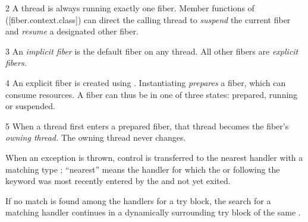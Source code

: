 
2 A thread is always running exactly one fiber. Member functions of \fiber
([fiber.context.class]) can direct the calling thread to \emph{suspend} the
current fiber and \emph{resume} a designated other fiber.

3 An \emph{implicit fiber} is the default fiber on any thread. All other
fibers are \emph{explicit fibers.}

4 An explicit fiber is created using \fiber. Instantiating \fiber \emph{prepares} a
fiber, which can consume resources. A fiber can thus be in one of three
states: prepared, running or suspended.

5 When a thread first enters a prepared fiber, that thread becomes the
fiber's \emph{owning thread.} The owning thread never changes.
\cbend


When an exception is thrown, control is transferred to the nearest handler
with a matching type ; ``nearest'' means the handler for
which the  or
 following the  keyword was
most recently entered by the  and
not yet exited.




If no match is found among the handlers for a try block, the search for a
matching handler continues in a dynamically surrounding try block of the same
.


